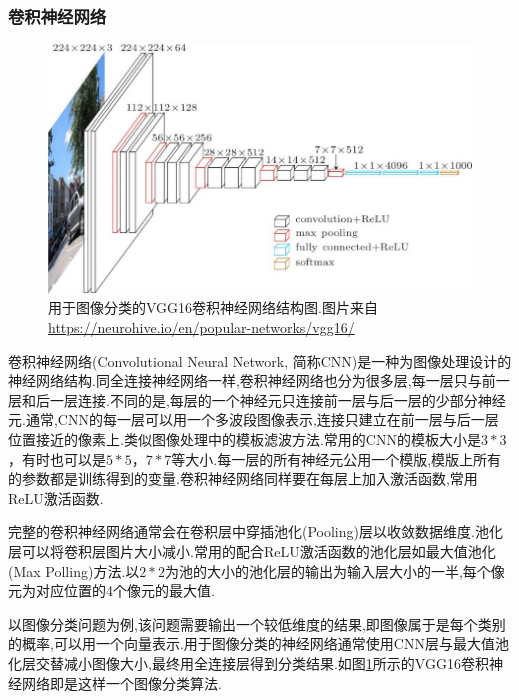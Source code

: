 \subsubsection{卷积神经网络}  \label{section:cnn}
\par
\begin{figure}[htbp!]
    \centering
    \includegraphics[width = 1.\textwidth]{chap/img/vgg16-neural-network.jpg}
    \caption{
        用于图像分类的VGG16\supercite{simonyan2014very}卷积神经网络结构图.图片来自 \url{https://neurohive.io/en/popular-networks/vgg16/}
        }\label{fig:vgg16_architecture}
\end{figure}
\par
卷积神经网络(Convolutional Neural Network, 简称CNN)是一种为图像处理设计的神经网络结构.同全连接神经网络一样,卷积神经网络也分为很多层,每一层只与前一层和后一层连接.不同的是,每层的一个神经元只连接前一层与后一层的少部分神经元.通常,CNN的每一层可以用一个多波段图像表示,连接只建立在前一层与后一层位置接近的像素上.类似图像处理中的模板滤波方法.常用的CNN的模板大小是$3*3$，有时也可以是$5*5$，$7*7$等大小.每一层的所有神经元公用一个模版,模版上所有的参数都是训练得到的变量.卷积神经网络同样要在每层上加入激活函数,常用ReLU激活函数.
\par
完整的卷积神经网络通常会在卷积层中穿插池化(Pooling)层以收敛数据维度.池化层可以将卷积层图片大小减小.常用的配合ReLU激活函数的池化层如最大值池化(Max Polling)方法.以$2*2$为池的大小的池化层的输出为输入层大小的一半,每个像元为对应位置的4个像元的最大值.
\par
以图像分类问题为例,该问题需要输出一个较低维度的结果,即图像属于是每个类别的概率,可以用一个向量表示.用于图像分类的神经网络通常使用CNN层与最大值池化层交替减小图像大小,最终用全连接层得到分类结果.如图\ref{fig:vgg16_architecture}所示的VGG16\supercite{simonyan2014very}卷积神经网络即是这样一个图像分类算法.
\par
